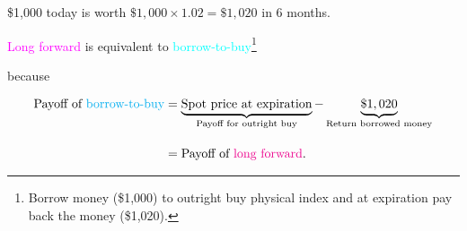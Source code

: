 \begin{frame}[fragile,t]
	\begin{center}
		\$1,000 today is worth $\$1,000 \times 1.02 = \$1,020$ in 6 months.

	\bigskip
	\mySeparateLine
	\bigskip

	\textcolor{magenta}{Long forward} is equivalent to
	\textcolor{cyan}{borrow-to-buy}\footnote{Borrow money (\$1,000) to outright buy physical index and at expiration
	pay back the money (\$1,020).}

	\bigskip
	because\\
	\bigskip


	\begin{align*}
		\text{Payoff of \textcolor{cyan}{borrow-to-buy}} & = \underbrace{\text{Spot price at expiration}}_{\text{Payoff for outright buy}} - \underbrace{\$1,020}_{\text{Return borrowed money}} \\[1em]
																										 & = \text{Payoff of \textcolor{magenta}{long forward}}.
	\end{align*}


	\end{center}
\end{frame}
